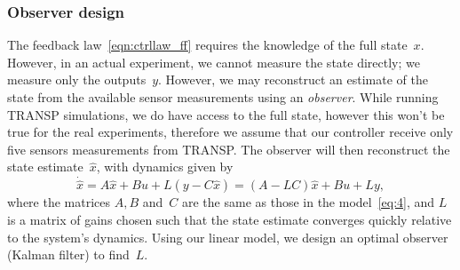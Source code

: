 \documentclass[12pt,lot, lof]{puthesis}
\begin{document}
%

\subsubsection{Observer design} 

The feedback law~\eqref{eqn:ctrllaw_ff} requires the knowledge of the full state~$x$.  However, in an actual experiment, we cannot measure the state directly; we measure only the outputs~$y$.  However, we may reconstruct an estimate of the state from the available sensor measurements using an {\em observer}.
While running TRANSP simulations, we do have access to the full state, however this won't be true for the real experiments, therefore we assume that our controller receive only five sensors measurements from TRANSP. The observer will then reconstruct the state estimate~$\hat x$, with dynamics given by
\begin{equation}
		\dot{\hat{x}} =  A \hat{x} + B u + L (y - C \hat{x}) 
			= (A- L C) \hat{x} + B u + L y,
		\label{obs}
\end{equation}
where the matrices $A,B$ and~$C$ are the same as those in the model~\eqref{eq:4}, and $L$ is a matrix of gains chosen such that the state estimate converges quickly relative to the system's dynamics.
Using our linear model, we design an optimal observer (Kalman filter) to find~$L$.
\end{document}
